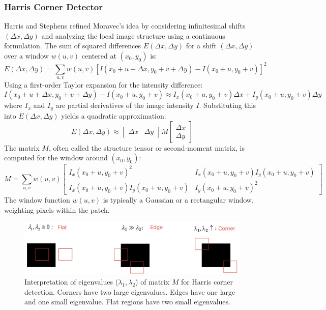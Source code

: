 \subsubsection{Harris Corner Detector}
Harris and Stephens refined Moravec's idea by considering infinitesimal shifts $(\Delta x, \Delta y)$ and analyzing the local image structure using a continuous formulation. The sum of squared differences $E(\Delta x, \Delta y)$ for a shift $(\Delta x, \Delta y)$ over a window $w(u,v)$ centered at $(x_0, y_0)$ is:
\[ E(\Delta x, \Delta y) = \sum_{u,v} w(u,v) [I(x_0+u+\Delta x, y_0+v+\Delta y) - I(x_0+u, y_0+v)]^2 \]
Using a first-order Taylor expansion for the intensity difference:
\[ I(x_0+u+\Delta x, y_0+v+\Delta y) - I(x_0+u, y_0+v) \approx I_x(x_0+u, y_0+v)\Delta x + I_y(x_0+u, y_0+v)\Delta y \]
where $I_x$ and $I_y$ are partial derivatives of the image intensity $I$.
Substituting this into $E(\Delta x, \Delta y)$ yields a quadratic approximation:
\[ E(\Delta x, \Delta y) \approx \begin{bmatrix} \Delta x & \Delta y \end{bmatrix} M \begin{bmatrix} \Delta x \\ \Delta y \end{bmatrix} \]
The matrix $M$, often called the structure tensor or second-moment matrix, is computed for the window around $(x_0,y_0)$:
\[ M = \sum_{u,v} w(u,v)
\begin{bmatrix}
I_x(x_0+u,y_0+v)^2 & I_x(x_0+u,y_0+v)I_y(x_0+u,y_0+v) \\
I_x(x_0+u,y_0+v)I_y(x_0+u,y_0+v) & I_y(x_0+u,y_0+v)^2
\end{bmatrix} \]
The window function $w(u,v)$ is typically a Gaussian or a rectangular window, weighting pixels within the patch.

\begin{figure}[htbp]
  \centering
  \includegraphics[width=0.9\linewidth]{./img/harris_corner_detector.jpg}
  \caption{Interpretation of eigenvalues ($\lambda_1, \lambda_2$) of matrix $M$ for Harris corner detection. Corners have two large eigenvalues. Edges have one large and one small eigenvalue. Flat regions have two small eigenvalues.}
  \label{fig:harris_corner_detector}
\end{figure}

